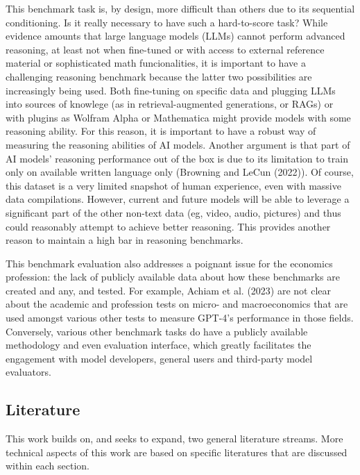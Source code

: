 \documentclass[
]{article}
\begin{document}
This benchmark task is, by design, more difficult than others due to its
sequential conditioning. Is it really necessary to have such a
hard-to-score task? While evidence amounts that large language models
(LLMs) cannot perform advanced reasoning, at least not when fine-tuned
or with access to external reference material or sophisticated math
funcionalities, it is important to have a challenging reasoning
benchmark because the latter two possibilities are increasingly being
used. Both fine-tuning on specific data and plugging LLMs into sources
of knowlege (as in retrieval-augmented generations, or RAGs) or with
plugins as Wolfram Alpha or Mathematica might provide models with some
reasoning ability. For this reason, it is important to have a robust way
of measuring the reasoning abilities of AI models. Another argument is
that part of AI models' reasoning performance out of the box is due to
its limitation to train only on available written language only
(Browning and LeCun (2022)). Of course, this dataset is a very limited
snapshot of human experience, even with massive data compilations.
However, current and future models will be able to leverage a
significant part of the other non-text data (eg, video, audio, pictures)
and thus could reasonably attempt to achieve better reasoning. This
provides another reason to maintain a high bar in reasoning benchmarks.

This benchmark evaluation also addresses a poignant issue for the
economics profession: the lack of publicly available data about how
these benchmarks are created and any, and tested. For example, Achiam et
al. (2023) are not clear about the academic and profession tests on
micro- and macroeconomics that are used amongst various other tests to
measure GPT-4's performance in those fields. Conversely, various other
benchmark tasks do have a publicly available methodology and even
evaluation interface, which greatly facilitates the engagement with
model developers, general users and third-party model evaluators.

\subsection{Literature}\label{literature}

This work builds on, and seeks to expand, two general literature
streams. More technical aspects of this work are based on specific
literatures that are discussed within each section.
\end{document}
